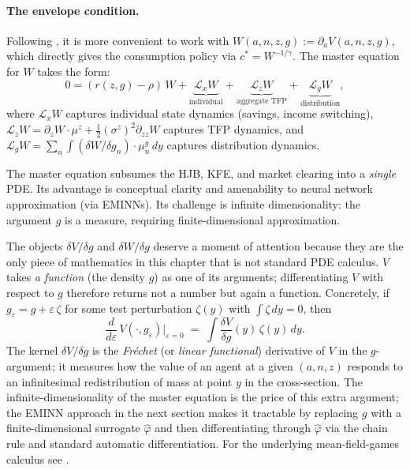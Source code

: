 \documentclass[11pt,a4paper]{report}
\begin{document}
\paragraph{The envelope condition.}  Following \citet{gu2024masterequations}, it is more convenient to work with $W(a,n,z,g) := \partial_a V(a,n,z,g)$, which directly gives the consumption policy via $c^* = W^{-1/\gamma}$.  The master equation for $W$ takes the form:
\begin{equation}
0 = (r(z,g) - \rho)\,W + \underbrace{\mathcal{L}_x W}_{\text{individual}} + \underbrace{\mathcal{L}_z W}_{\text{aggregate TFP}} + \underbrace{\mathcal{L}_g W}_{\text{distribution}},
\label{eq:master_W}
\end{equation}
where $\mathcal{L}_x W$ captures individual state dynamics (savings, income switching), $\mathcal{L}_z W = \partial_z W \cdot \mu^z + \frac{1}{2}(\sigma^z)^2\partial_{zz}W$ captures TFP dynamics, and $\mathcal{L}_g W = \sum_n \int (\delta W/\delta g_n)\cdot\mu^g_n\,dy$ captures distribution dynamics.

\begin{keyinsightbox}
The master equation subsumes the HJB, KFE, and market clearing into a \emph{single} PDE.  Its advantage is conceptual clarity and amenability to neural network approximation (via EMINNs).  Its challenge is infinite dimensionality: the argument $g$ is a measure, requiring finite-dimensional approximation.
\end{keyinsightbox}

\begin{remarkbox}
The objects $\delta V/\delta g$ and $\delta W/\delta g$ deserve a moment of attention because they are the only piece of mathematics in this chapter that is not standard PDE calculus.  $V$ takes \emph{a function} (the density $g$) as one of its arguments; differentiating $V$ with respect to $g$ therefore returns not a number but again a function.  Concretely, if $g_\varepsilon = g + \varepsilon\,\zeta$ for some test perturbation $\zeta(y)$ with $\int \zeta\, dy = 0$, then
\[
  \frac{d}{d\varepsilon}\, V(\cdot, g_\varepsilon)\Big|_{\varepsilon=0}
  \;=\; \int \frac{\delta V}{\delta g}(y)\,\zeta(y)\,dy.
\]
The kernel $\delta V/\delta g$ is the \emph{Fr\'echet} (or \emph{linear functional}) derivative of $V$ in the $g$-argument; it measures how the value of an agent at a given $(a,n,z)$ responds to an infinitesimal redistribution of mass at point $y$ in the cross-section.  The infinite-dimensionality of the master equation is the price of this extra argument; the EMINN approach in the next section makes it tractable by replacing $g$ with a finite-dimensional surrogate $\hat\varphi$ and then differentiating through $\hat\varphi$ via the chain rule and standard automatic differentiation.  For the underlying mean-field-games calculus see \citet{cardaliaguet2019master}.
\end{remarkbox}
\end{document}
